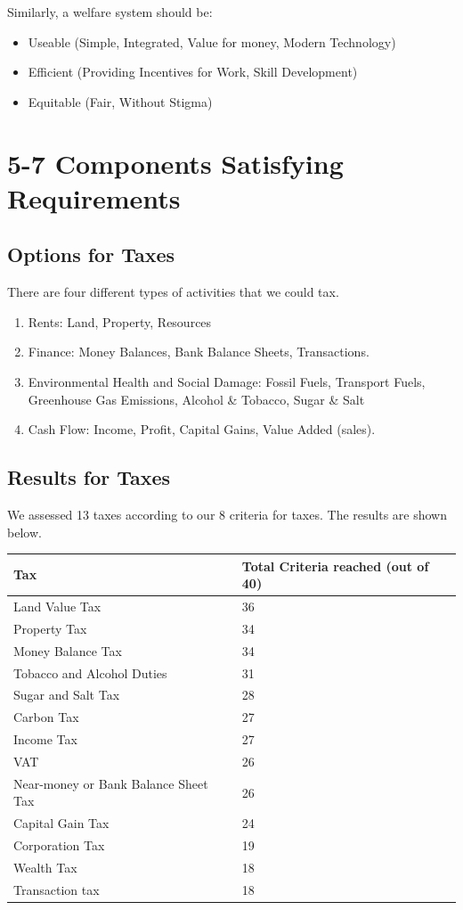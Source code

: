 \documentclass[]{tufte-handout}
\providecommand{\tightlist}{%
  \setlength{\itemsep}{0pt}\setlength{\parskip}{0pt}}
\begin{document}
Similarly, a welfare system should be:

\begin{itemize}
\tightlist
\item
  Useable (Simple, Integrated, Value for money, Modern Technology)
\item
  Efficient (Providing Incentives for Work, Skill Development)
\item
  Equitable (Fair, Without Stigma)
\end{itemize}

\hypertarget{components-satisfying-requirements}{%
\section{5-7 Components Satisfying
Requirements}\label{components-satisfying-requirements}}

\hypertarget{options-for-taxes}{%
\subsection{Options for Taxes}\label{options-for-taxes}}

There are four different types of activities that we could tax.

\begin{enumerate}
\def\labelenumi{\arabic{enumi}.}
\tightlist
\item
  Rents: Land, Property, Resources
\item
  Finance: Money Balances, Bank Balance Sheets, Transactions.
\item
  Environmental Health and Social Damage: Fossil Fuels, Transport Fuels,
  Greenhouse Gas Emissions, Alcohol \& Tobacco, Sugar \& Salt
\item
  Cash Flow: Income, Profit, Capital Gains, Value Added (sales).
\end{enumerate}

\hypertarget{results-for-taxes}{%
\subsection{Results for Taxes}\label{results-for-taxes}}

We assessed 13 taxes according to our 8 criteria for taxes. The results
are shown below.

\begin{longtable}[]{@{}ll@{}}
\toprule
\textbf{Tax} & \textbf{Total Criteria reached (out of
40)}\tabularnewline
\midrule
\endhead
Land Value Tax & 36\tabularnewline
Property Tax & 34\tabularnewline
Money Balance Tax & 34\tabularnewline
Tobacco and Alcohol Duties & 31\tabularnewline
Sugar and Salt Tax & 28\tabularnewline
Carbon Tax & 27\tabularnewline
Income Tax & 27\tabularnewline
VAT & 26\tabularnewline
Near-money or Bank Balance Sheet Tax & 26\tabularnewline
Capital Gain Tax & 24\tabularnewline
Corporation Tax & 19\tabularnewline
Wealth Tax & 18\tabularnewline
Transaction tax & 18\tabularnewline
\bottomrule
\end{longtable}
\end{document}
